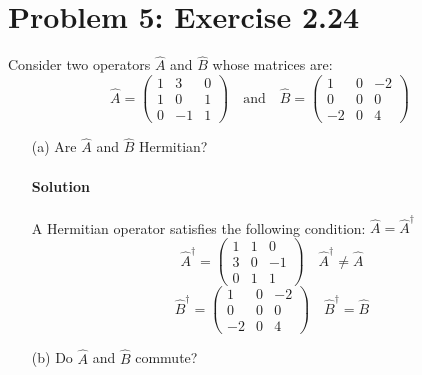 \documentclass{article}
\begin{document}
\clearpage	
	
	\section*{Problem 5: Exercise 2.24}
	Consider two operators $\hat{A}$ and $\hat{B}$ whose matrices are:
	\[
		\hat{A} =
		\begin{pmatrix}
			1 & 3 & 0 \\
			1 & 0 & 1 \\
			0 & -1 & 1 
		\end{pmatrix}
		\quad \text{and} \quad
		\hat{B} =
		\begin{pmatrix}
			1 & 0 & -2 \\
			0 & 0 & 0 \\
			-2 & 0 & 4 
		\end{pmatrix}
	\]
	\begin{enumerate}
		\item[(a)] Are $\hat{A}$ and $\hat{B}$ Hermitian?
		\paragraph{Solution} A Hermitian operator satisfies the following condition: $\hat{A} = \hat{A}^\dagger$
		\[
		\hat{A}^\dagger =
		\begin{pmatrix}
			1 & 1 & 0 \\
			3 & 0 & -1 \\
			0 & 1 & 1 
		\end{pmatrix}
		\quad \boxed{\hat{A}^\dagger \neq \hat{A}}
		\]
		\[
		\hat{B}^\dagger =
		\begin{pmatrix}
			1 & 0 & -2 \\
			0 & 0 & 0 \\
			-2 & 0 & 4
		\end{pmatrix}
		\quad \boxed{\hat{B}^\dagger = \hat{B}}
		\]
		
		\item[(b)] Do $\hat{A}$ and $\hat{B}$ commute?

\end{enumerate}
\end{document}
